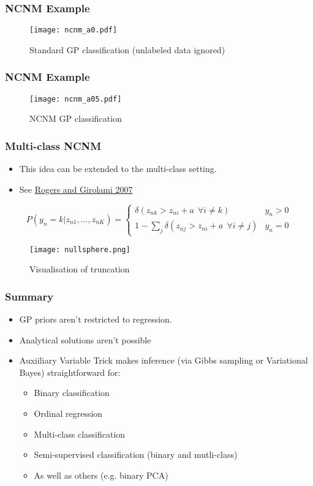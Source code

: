 \begin{frame}
	\frametitle{NCNM Example}
	\begin{figure}[tbh]
		\centering\texttt{[image: ncnm\_a0.pdf]}
		\centering\caption{\label{fig:ncnm_a0}Standard GP classification (unlabeled data ignored)}
	\end{figure}
\end{frame}

\begin{frame}
	\frametitle{NCNM Example}
	\begin{figure}[tbh]
		\centering\texttt{[image: ncnm\_a05.pdf]}
		\centering\caption{\label{fig:ncnm_a0.5}NCNM GP classification}
	\end{figure}
\end{frame}

\begin{frame}
	\frametitle{Multi-class \ac{NCNM}}
	\begin{itemize}
		\item This idea can be extended to the multi-class setting.
		\item See \href{http://jmlr.org/proceedings/papers/v1/rogers07a/rogers07a.pdf}{Rogers and Girolami 2007}
	\end{itemize}
		{\small \[
		P(y_n=k|z_{n1},\ldots,z_{nK}) = \left \{
				\begin{array}{cc}
					\delta(z_{nk} > z_{ni} + a~~\forall i \neq k) & y_n>0\\
					1 - \sum_j \delta(z_{nj} > z_{ni} + a ~~\forall i \neq j) & y_n=0
				\end{array}
			\right.
		\]}
		\begin{figure}[tbh]
			\centering\texttt{[image: nullsphere.png]}
			\centering\caption{\label{fig:nullsphere}Visualisation of truncation}
		\end{figure}
\end{frame}

\begin{frame}
	\frametitle{Summary}
	\begin{itemize}
		\item \ac{GP} priors aren't restricted to regression.
		\item Analytical solutions aren't possible
		\item Auxiiliary Variable Trick makes inference (via Gibbs sampling or Variational Bayes) straightforward for:
		\begin{itemize}
			\item Binary classification
			\item Ordinal regression
			\item Multi-class classification
			\item Semi-supervised classification (binary and mutli-class)
			\item As well as others (e.g. binary PCA)
		\end{itemize}
	\end{itemize}
\end{frame}
